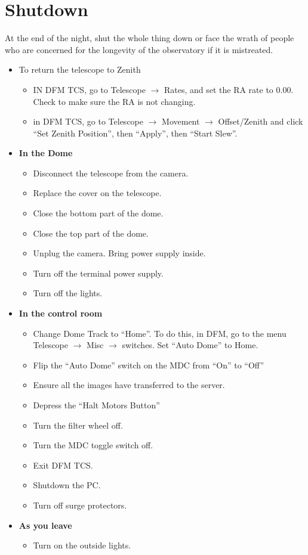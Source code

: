 \documentclass[letterpaper, 12pt]{report}
\begin{document}
\chapter{Shutdown}\label{ch:7}
At the end of the night, shut the whole thing down or face the wrath of people who are concerned for the longevity of the observatory if it is mistreated.
\begin{itemize}
	\item To return the telescope to Zenith
	\begin{itemize}
		\item IN DFM TCS, go to Telescope $\rightarrow$ Rates, and set the RA rate to 0.00. Check to make sure the RA is not changing.
		\item in DFM TCS, go to Telescope $\rightarrow$ Movement $\rightarrow$ Offset/Zenith and click ``Set Zenith Position'', then ``Apply'', then ``Start Slew''.
	\end{itemize}
\end{itemize}
\begin{itemize}
	\item \large \textbf{In the Dome}
	\begin{itemize}
	\item Disconnect the telescope from the camera.
	\item Replace the cover on the telescope.
	\item Close the bottom part of the dome.
	\item Close the top part of the dome.
	\item Unplug the camera. Bring power supply inside.
	\item Turn off the terminal power supply.
	\item Turn off the lights.
	\end{itemize}

	\item \large \textbf{In the control room}
	\begin{itemize}
		\item Change Dome Track to ``Home''. To do this, in DFM, go to the menu Telescope $\rightarrow$ Misc $\rightarrow$ switches. Set ``Auto Dome'' to Home.
		\item Flip the ``Auto Dome'' switch on the MDC from ``On'' to ``Off''
		\item Ensure all the images have transferred to the server.
		\item Depress the ``Halt Motors Button''
		\item Turn the filter wheel off.
		\item Turn the MDC toggle switch off.
		\item Exit DFM TCS.
		\item Shutdown the PC.
		\item Turn off surge protectors.
	\end{itemize}

\item \large \textbf{As you leave}
\begin{itemize}
	\item Turn on the outside lights.
\end{itemize}
\end{itemize}
\newpage
\end{document}
